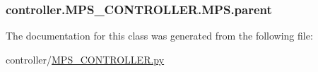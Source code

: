 \subsubsection[{parent}]{\setlength{\rightskip}{0pt plus 5cm}controller.\+M\+P\+S\+\_\+\+C\+O\+N\+T\+R\+O\+L\+L\+E\+R.\+M\+P\+S.\+parent}\label{classcontroller_1_1MPS__CONTROLLER_1_1MPS_a1f68071cc37bb25d2118c03d7c6053de}


The documentation for this class was generated from the following file\+:\begin{DoxyCompactItemize}
\item 
controller/\hyperlink{MPS__CONTROLLER_8py}{M\+P\+S\+\_\+\+C\+O\+N\+T\+R\+O\+L\+L\+E\+R.\+py}\end{DoxyCompactItemize}
